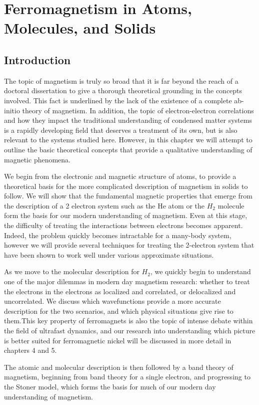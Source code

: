 \chapter{Ferromagnetism in Atoms, Molecules, and Solids}

\section{Introduction}
The topic of magnetism is truly so broad that it is far beyond the reach of a doctoral dissertation to give a thorough theoretical grounding in the concepts involved. This fact is underlined by the lack of the existence of a complete ab-initio theory of magnetism. In addition, the topic of electron-electron correlations and how they impact the traditional understanding of condensed matter systems is a rapidly developing field that deserves a treatment of its own, but is also relevant to the systems studied here. However, in this chapter we will attempt to outline the basic theoretical concepts that provide a qualitative understanding of magnetic phenomena.

We begin from the electronic and magnetic structure of atoms, to provide a theoretical basis for the more complicated description of magnetism in solids to follow. We will show that the fundamental magnetic properties that emerge from the description of a 2 electron system such as the He atom or the $H_2$ molecule form the basis for our modern understanding of magnetism. Even at this stage, the difficulty of treating the interactions between electrons becomes apparent. Indeed, the problem quickly becomes intractable for a many-body system, however we will provide several techniques for treating the 2-electron system that have been shown to work well under various approximate situations.

As we move to the molecular description for $H_2$, we quickly begin to understand one of the major dilemmas in modern day magnetism research: whether to treat the electrons in the electrons as localized and correlated, or delocalized and uncorrelated. We discuss which wavefunctions provide a more accurate description for the two scenarios, and which physical situations give rise to them.This key property of ferromagnets is also the topic of intense debate within the field of ultrafast dynamics, and our research into understanding which picture is better suited for ferromagnetic nickel will be discussed in more detail in chapters 4 and 5.

The atomic and molecular description is then followed by a band theory of magnetism, beginning from band theory for a single electron, and progressing to the Stoner model, which forms the basis for much of our modern day understanding of magnetism.  

